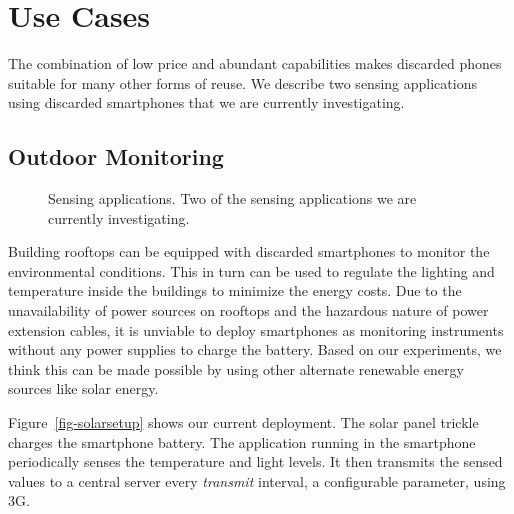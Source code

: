 \section{Use Cases}
\label{sec-usecases}
The combination of low price and abundant capabilities makes discarded phones
suitable for many other forms of reuse. 
We describe two sensing applications using discarded smartphones that we are
currently investigating.
\subsection{Outdoor Monitoring}
\label{sec-rooftop}
\begin{figure}[t]
  \centering
  \quad


  \vspace*{-0.1in}

  \caption{\small Sensing applications.
  \textnormal{Two of the sensing applications we are currently investigating.}}

  \vspace*{-0.1in}

\end{figure}
Building rooftops can be equipped with discarded smartphones to monitor the
environmental conditions. This in turn can be used to regulate the lighting and
temperature inside the buildings to minimize the energy costs.
Due to the unavailability of power sources on rooftops and the hazardous nature of
power extension cables, it is unviable to deploy smartphones as monitoring
instruments without any power supplies to charge the battery.
Based on our experiments, we think this can be made possible by using other
alternate renewable energy sources like solar energy.

Figure~\ref{fig-solarsetup} shows our current deployment. The solar panel trickle
charges the smartphone battery. The application running in the smartphone
periodically senses the temperature and light levels. It then transmits the
sensed values to a central server every \textit{transmit} interval, a
configurable parameter, using 3G. 

